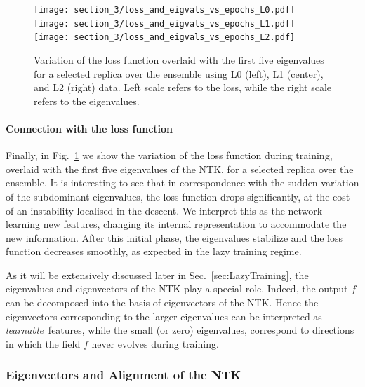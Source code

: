 \begin{figure}[t]
  \centering
  \texttt{[image: section\_3/loss\_and\_eigvals\_vs\_epochs\_L0.pdf]}
  \texttt{[image: section\_3/loss\_and\_eigvals\_vs\_epochs\_L1.pdf]}
  \texttt{[image: section\_3/loss\_and\_eigvals\_vs\_epochs\_L2.pdf]}
  \caption{Variation of the loss function overlaid with the first five
  eigenvalues for a selected replica over the ensemble using L0 (left), L1
  (center), and L2 (right) data. Left scale refers to the loss, while the right
  scale refers to the eigenvalues.}
  \label{fig:Loss}
\end{figure}

\paragraph{Connection with the loss function} Finally, in Fig.~\ref{fig:Loss} we
show the variation of the loss function during training, overlaid with the first
five eigenvalues of the NTK, for a selected replica over the ensemble. It is
interesting to see that in correspondence with the sudden variation of the
subdominant eigenvalues, the loss function drops significantly, at the cost of
an instability localised in the descent. We interpret this as the network
learning new features, changing its internal representation to accommodate the
new information. After this initial phase, the eigenvalues stabilize and the
loss function decreases smoothly, as expected in the lazy training regime.

As it will be extensively discussed later in Sec.~\ref{sec:LazyTraining}, the
eigenvalues and eigenvectors of the NTK play a special role. Indeed, the output
$f$ can be decomposed into the basis of eigenvectors of the NTK. Hence the
eigenvectors corresponding to the larger eigenvalues can be interpreted as {\em
learnable}\ features, while the small (or zero) eigenvalues, correspond to
directions in which the field $f$ never evolves during training.


\subsubsection{Eigenvectors and Alignment of the NTK}
\label{sec:NTKAlign}


